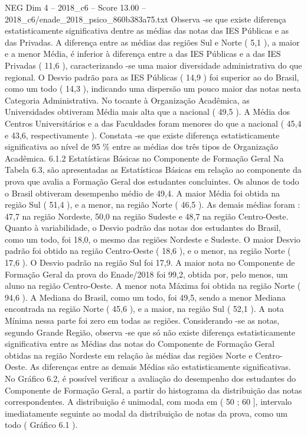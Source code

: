 \begin{textsample}{NEG Dim 4 – 2018\_c6 – Score 13.00 – 2018\_c6/enade\_2018\_psico\_860b383a75.txt}
Observa -se que existe diferença estatisticamente significativa dentre as médias das notas das IES Públicas e as das Privadas.
A diferença entre as médias das regiões Sul e Norte ( 5,1 ), a maior e a menor Média, é inferior à diferença entre a das IES Públicas e a das IES Privadas ( 11,6 ), caracterizando -se uma maior diversidade administrativa do que regional.
O Desvio padrão para as IES Públicas ( 14,9 ) foi superior ao do Brasil, como um todo ( 14,3 ), indicando uma dispersão um pouco maior das notas nesta Categoria Administrativa.
No tocante à Organização Acadêmica, as Universidades obtiveram Média mais alta que a nacional ( 49,5 ).
A Média dos Centros Universitários e a das Faculdades foram menores do que a nacional ( 45,4 e 43,6, respectivamente ).
Constata -se que existe diferença estatisticamente significativa ao nível de 95 \% entre as médias dos três tipos de Organização Acadêmica. 6.1.2 Estatísticas Básicas no Componente de Formação Geral Na Tabela 6.3, são apresentadas as Estatísticas Básicas em relação ao componente da prova que avalia a Formação Geral dos estudantes concluintes.
Os alunos de todo o Brasil obtiveram desempenho médio de 49,4.
A maior Média foi obtida na região Sul ( 51,4 ), e a menor, na região Norte ( 46,5 ).
As demais médias foram : 47,7 na região Nordeste, 50,0 na região Sudeste e 48,7 na região Centro-Oeste.
Quanto à variabilidade, o Desvio padrão das notas dos estudantes do Brasil, como um todo, foi 18,0, o mesmo das regiões Nordeste e Sudeste.
O maior Desvio padrão foi obtido na região Centro-Oeste ( 18,6 ), e o menor, na região Norte ( 17,6 ).
O Desvio padrão na região Sul foi 17,9.
A maior nota no Componente de Formação Geral da prova do Enade/2018 foi 99,2, obtida por, pelo menos, um aluno na região Centro-Oeste.
A menor nota Máxima foi obtida na região Norte ( 94,6 ).
A Mediana do Brasil, como um todo, foi 49,5, sendo a menor Mediana encontrada na região Norte ( 45,6 ), e a maior, na região Sul ( 52,1 ).
A nota Mínima nessa parte foi zero em todas as regiões.
Considerando -se as notas, segundo Grande Região, observa -se que só não existe diferença estatisticamente significativa entre as Médias das notas do Componente de Formação Geral obtidas na região Nordeste em relação às médias das regiões Norte e Centro-Oeste.
As diferenças entre as demais Médias são estatisticamente significativas.
No Gráfico 6.2, é possível verificar a avaliação do desempenho dos estudantes do Componente de Formação Geral, a partir do histograma da distribuição das notas correspondentes.
A distribuição é unimodal, com moda em ( 50 ; 60 ], intervalo imediatamente seguinte ao modal da distribuição de notas da prova, como um todo ( Gráfico 6.1 ).

\end{textsample}
